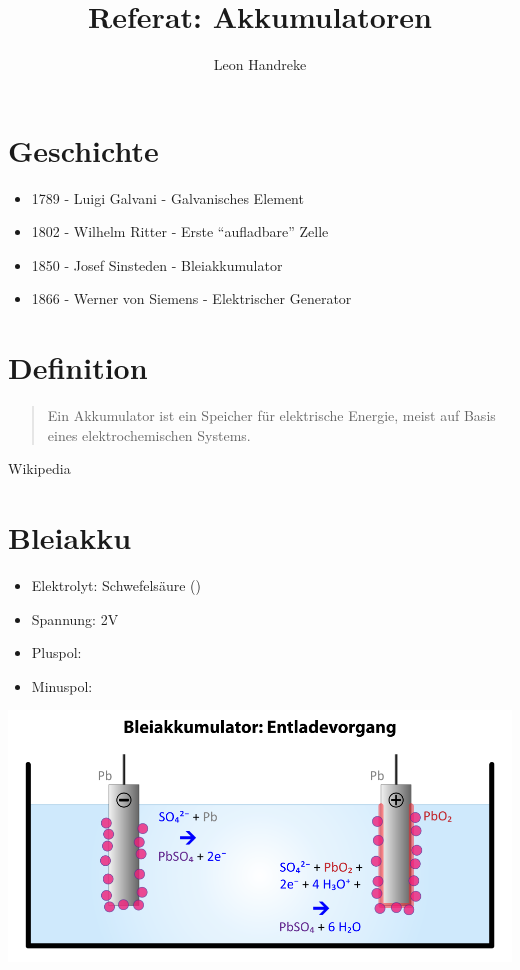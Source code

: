 \documentclass[11pt]{article}
\title{Referat: Akkumulatoren}
\author{Leon Handreke}
\date{}                                           %
\begin{document}
\maketitle
{}\selectfont
\onehalfspacing

\section{Geschichte}
\begin{itemize}
\item 1789 - Luigi Galvani - Galvanisches Element
\item 1802 - Wilhelm Ritter - Erste ``aufladbare'' Zelle
\item 1850 - Josef Sinsteden - Bleiakkumulator
\item 1866 - Werner von Siemens - Elektrischer Generator
\end{itemize}

\section{Definition}
\begin{quote}
  Ein Akkumulator ist ein Speicher für elektrische Energie, meist auf Basis eines elektrochemischen Systems.
\end{quote}
\small{Wikipedia}


\section{Bleiakku}
\begin{itemize}
\item Elektrolyt: Schwefelsäure ()
\item Spannung: 2V
\item Pluspol: 
\item Minuspol: 
\end{itemize}

\includegraphics[width=\textwidth]{bleiakku-entladung.png}
\end{document}
